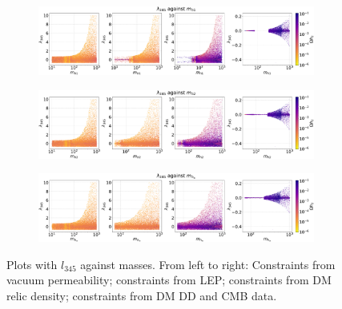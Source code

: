 \documentclass[12pt]{article}
\begin{document}
\begin{figure}[H]
    \begin{subfigure}[b]{\columnwidth}
      \centering
      \includegraphics[width=1\columnwidth]{4plot/l345_MD1.pdf}
    \end{subfigure}   
    
    \begin{subfigure}[b]{\columnwidth}
      \centering
      \includegraphics[width=1\columnwidth]{4plot/l345_MD2.pdf}
    \end{subfigure}

    \begin{subfigure}[b]{\columnwidth}
      \centering
      \includegraphics[width=1\columnwidth]{4plot/l345_MDP.pdf}
    \end{subfigure}
\caption{Plots with $l_{345}$ against masses. From left to right: Constraints from vacuum permeability; constraints from LEP; constraints from DM relic density; constraints from DM DD and CMB data.}
\end{figure}
\end{document}
